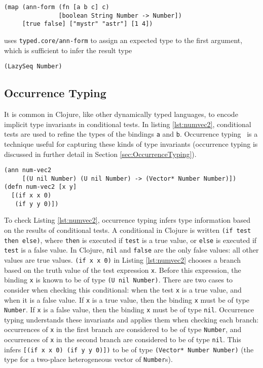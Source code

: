 \begin{lstlisting}
(map (ann-form (fn [a b c] c) 
               [boolean String Number -> Number]) 
     [true false] ["mystr" "astr"] [1 4])
\end{lstlisting}

uses \lstinline|typed.core/ann-form| to assign an expected type to
the first argument,
which is sufficient to infer the result type

\begin{lstlisting}
(LazySeq Number)
\end{lstlisting}


\subsection{Occurrence Typing}

It is common in Clojure, like other dynamically typed languages, to
encode implicit type invariants in conditional tests.
In listing \ref{lst:numvec2}, conditional tests are used
to refine the types of the bindings \lstinline|a| and \lstinline|b|.
Occurrence typing~\cite{TF10} is a technique useful for capturing these kinds
of type invariants (occurrence typing is discussed in further detail in Section \ref{sec:OccurrenceTyping}).

\begin{lstlisting}[caption=Example of occurrence typing in Typed Clojure, label=lst:numvec2]
(ann num-vec2 
     [(U nil Number) (U nil Number) -> (Vector* Number Number)])
(defn num-vec2 [x y]
  [(if x x 0) 
   (if y y 0)])
\end{lstlisting}

To check Listing \ref{lst:numvec2}, occurrence typing infers type information based on the results of conditional tests.
A conditional in Clojure is written \lstinline|(if test then else)|, where \lstinline|then|
is executed if \lstinline|test| is a true value, or \lstinline|else| is executed if \lstinline|test|
is a false value.
In Clojure, \lstinline|nil| and \lstinline|false| are the only false values: all other values are true values.
\lstinline|(if x x 0)| in Listing \ref{lst:numvec2} chooses a branch based on the truth value of the test expression \lstinline|x|.
Before this expression, the binding \lstinline|x| is known to be of type \lstinline|(U nil Number)|.
There are two cases to consider when checking this conditional: when the test \lstinline|x| is a true value, and when it is a false value.
If \lstinline|x| is a true value, then the binding \lstinline|x| must be of type \lstinline|Number|.
If \lstinline|x| is a false value, then the binding \lstinline|x| must be of type \lstinline|nil|.
Occurrence typing understands these invariants and applies them when checking each branch:
occurrences of \lstinline|x| in the first branch are considered to be of type \lstinline|Number|, and
occurrences of \lstinline|x| in the second branch are considered to be of type \lstinline|nil|.
This infers \lstinline|[(if x x 0) (if y y 0)])| to be of type
\lstinline|(Vector* Number Number)| (the type for a two-place heterogeneous vector of \lstinline|Number|s).

